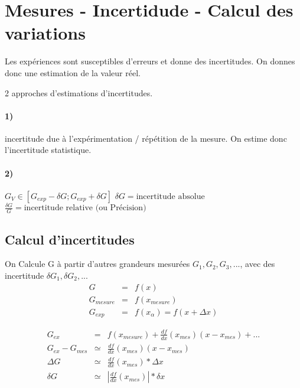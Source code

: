 \section{Mesures - Incertidude - Calcul des variations}
Les expériences sont susceptibles d'erreurs et donne des incertitudes. On donnes donc une estimation de la valeur réel.

2 approches d'estimations d'incertitudes. 
\paragraph{1)} incertitude due à l'expérimentation / répétition de la mesure. On estime donc l'incertitude statistique.
\paragraph{2)} $G_V \in [G_{exp} - \delta G ; G_{exp} + \delta G]$
$\delta G = \text{incertitude absolue}$~\\
$\frac{\delta G}{G} = \text{incertitude relative (ou Précision)}$

\subsection{Calcul d'incertitudes} On Calcule G à partir d'autres grandeurs mesurées $G_1, G_2, G_3, ...$, avec des incertitude $\delta G_1, \delta G_2, ...$
\[\begin{array}{rcl}
	G & = & f(x) \\
	G_{mesure} & = & f(x_{mesure}) \\
	G_{exp} & = & f(x_\alpha) = f(x + \Delta x)
\end{array}\]


\[\begin{array}{rcl}
	G_{ex} & = & f(x_{mesure}) + \frac{df}{dx} (x_{mes}) (x-x_{mes}) + ... \\ 
	G_{ex} - G_{mes} & \simeq & \frac{df}{dx}(x_{mes})(x-x_{mes}) \\
	\Delta G & \simeq & \frac{df}{dx}(x_{mes}) * \Delta x \\
	\delta G & \simeq & |\frac{df}{dx}(x_{mes})| * \delta x
\end{array}\]

